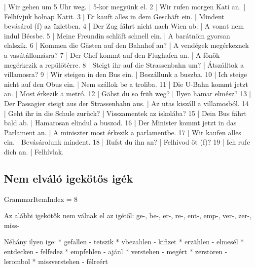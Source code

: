 \documentclass{article}
\newenvironment{desc}{\verbatim}{\endverbatim}
\newenvironment{exmp}{\verbatim}{\endverbatim}
\begin{document}
\begin{exmp}
1 | Wir gehen um 5 Uhr weg. | 5-kor megyünk el.
2 | Wir rufen morgen Kati an. | Felhívjuk holnap Katit.
3 | Er kauft alles in dem Geschäft ein. | Mindent bevásárol (f) az üzletben.
4 | Der Zug fährt nicht nach Wien ab. | A  vonat nem indul Bécsbe.
5 | Meine Freundin schläft schnell ein. | A barátnőm gyorsan elalszik.
6 | Kommen die Gästen auf den Bahnhof an? | A vendégek megérkeznek a vasútállomásra?
7 | Der Chef kommt auf den Flughafen an. | A főnök megérkezik a repülőtérre.
8 | Steigt ihr auf die Strassenbahn um? | Átszálltok a villamosra?
9 | Wir steigen in den Bus ein. | Beszállunk a buszba.
10 | Ich steige nicht auf den Obus ein. | Nem szállok be a troliba.
11 | Die U-Bahn kommt jetzt an. | Most érkezik a metró.
12 | Gähst du so früh weg? | Ilyen hamar elmész?
13 | Der Passagier steigt aus der Strassenbahn aus. | Az utas kiszáll a villamosból.
14 | Geht ihr in die Schule zurück? | Visszamentek az iskolába?
15 | Dein Bus fährt bald ab. | Hamarosan elindul a buszod.
16 | Der Minister kommt jetzt in das Parlament an. | A miniszter most érkezik a parlamentbe.
17 | Wir kaufen alles ein. | Bevásárolunk mindent.
18 | Rufst du ihn an? | Felhívod őt (f)?
19 | Ich rufe dich an. | Felhívlak.
\end{exmp}

\subsection{Nem elváló igekötős igék}

GrammarItemIndex = 8

\begin{desc}
Az alábbi igekötők nem válnak el az igétől:
ge-, be-, er-, re-, ent-, emp-, ver-, zer-, miss-

Néhány ilyen ige:
* gefallen - tetszik
* vbezahlen - kifizet
* erzählen - elmesél
* entdecken - felfedez
* empfehlen - ajánl
* verstehen - megért
* zerstören - lerombol
* missverstehen - félreért
\end{desc}
\end{document}
